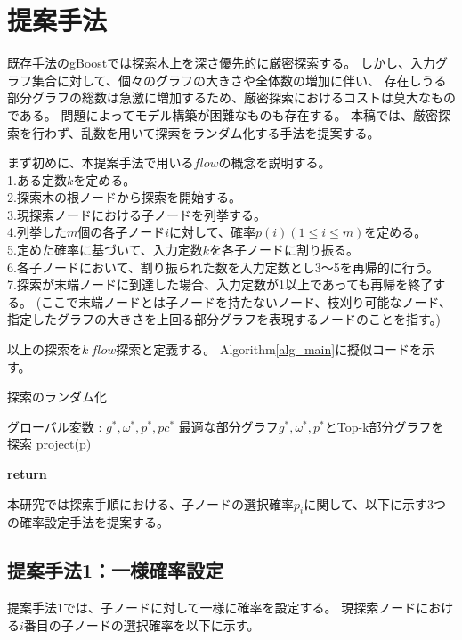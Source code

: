 \section{提案手法}
既存手法のgBoostでは探索木上を深さ優先的に厳密探索する。
しかし、入力グラフ集合に対して、個々のグラフの大きさや全体数の増加に伴い、
存在しうる部分グラフの総数は急激に増加するため、厳密探索におけるコストは莫大なものである。
問題によってモデル構築が困難なものも存在する。
本稿では、厳密探索を行わず、乱数を用いて探索をランダム化する手法を提案する。

まず初めに、本提案手法で用いる$flow$の概念を説明する。\\
1.ある定数$k$を定める。\\
2.探索木の根ノードから探索を開始する。\\
3.現探索ノードにおける子ノードを列挙する。\\
4.列挙した$m$個の各子ノード$i$に対して、確率$p(i) (1 \leq i \leq m)$を定める。\\
5.定めた確率に基づいて、入力定数$k$を各子ノードに割り振る。\\
6.各子ノードにおいて、割り振られた数を入力定数とし3〜5を再帰的に行う。\\
7.探索が末端ノードに到達した場合、入力定数が1以上であっても再帰を終了する。
(ここで末端ノードとは子ノードを持たないノード、枝刈り可能なノード、指定したグラフの大きさを上回る部分グラフを表現するノードのことを指す。)

以上の探索を$k\ flow$探索と定義する。
Algorithm\ref{alg_main}に擬似コードを示す。
\begin{algorithm}
  \small 
\caption{探索のランダム化}\label{alg_main}
\begin{algorithmic}[1]
\State グローバル変数 : $g^*,\omega^*,p^*,pc^*$
\State 最適な部分グラフ$g^*,\omega^*,p^*$とTop-k部分グラフを探索 
\State project(p)
\EndFor
\EndProcedure

\State \textbf{return}
\EndIf
\EndFunction
\end{algorithmic}
\end{algorithm}


本研究では探索手順における、子ノードの選択確率$p_i$に関して、以下に示す3つの確率設定手法を提案する。

\subsection{提案手法1：一様確率設定}
提案手法1では、子ノードに対して一様に確率を設定する。
現探索ノードにおける$i$番目の子ノードの選択確率を以下に示す。

